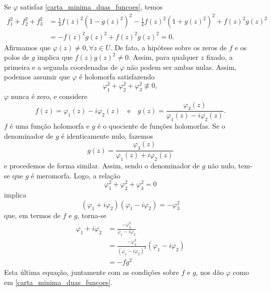 \begin{demonstracao}
	Se $\varphi$ satisfaz \eqref{carta_minima_duas_funcoes}, temos
	\begin{align*}
	f_1^2 + f_2^2 + f_3^2 &= \frac{1}{4} f(z)^2 (1 - g(z)^2)^2 - \frac{1}{4} f(z)^2 (1 + g(z)^2)^2 + f(z)^2 g(z)^2\\
	&= -f(z)^2 g(z)^2 + f(z)^2 g(z)^2 =0.
	\end{align*}
	Afirmamos que $\varphi(z) \neq 0, \forall z \in U$. De fato, a hipótese sobre os zeros de $f$ e os polos de $g$ implica que $f(z) g(z)^2 \neq 0$. Assim, para qualquer $z$ fixado, a primeira e a segunda coordenadas de $\varphi$ não podem ser ambas nulas.
	Assim, podemos assumir que $\varphi$ é holomorfa satisfazendo
	\begin{equation*}
	\varphi_1^2 + \varphi_2^2 + \varphi_3^2 \not\equiv 0,
	\end{equation*}
	$\varphi$ nunca é zero, e considere
	\begin{equation*}
	f(z) = \varphi_1(z) - i \varphi_2(z) \quad \text{e} \quad
	g(z) = \frac{\varphi_3(z)}{\varphi_1(z) - i \varphi_2(z)}.
	\end{equation*}
	$f$ é uma função holomorfa e $g$ é o quociente de funções holomorfas. Se o denominador de $g$ é identicamente nulo, fazemos
	\begin{equation*}
	g(z) = \frac{\varphi_3(z)}{\varphi_1(z) + i \varphi_2(z)}
	\end{equation*}
	e procedemos de forma similar.
	Assim, sendo o denominador de $g$ não nulo, tem-se que $g$ é meromorfa. Logo, a relação
	\begin{equation*}
	\varphi_1^2 + \varphi_2^2 + \varphi_3^2 = 0
	\end{equation*}
	implica
	\begin{equation*}
	(\varphi_1 + i \varphi_2)(\varphi_1 - i \varphi_2) = -\varphi_3^2
	\end{equation*}
	que, em termos de $f$ e $g$, torna-se
	\begin{align*}
	\varphi_1 + i \varphi_2 &= \frac{-\varphi_3^2}{\varphi_1 - i \varphi_2}\\
	&= \frac{-\varphi_3^2}{(\varphi_1 - i \varphi_2)^2} (\varphi_1 - i \varphi_2)\\
	&= -fg^2
	\end{align*}
	Esta última equação, juntamente com as condições sobre $f$ e $g$, nos dão $\varphi$ como em \eqref{carta_minima_duas_funcoes}.
\end{demonstracao}

